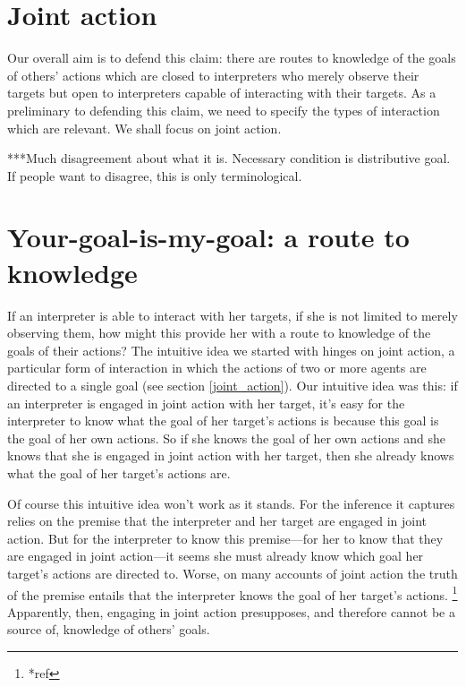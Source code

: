 \documentclass[12pt,a4paper]{extarticle}
\begin{document}
\section{Joint action}
\label{joint_action}
Our overall aim is to defend this claim:
there are routes to knowledge of the goals of others' actions
which are closed to
interpreters who merely observe their targets
but open to 
interpreters capable of interacting with their targets.
As a preliminary to defending this claim,
we need to specify the types of interaction which are relevant.
We shall focus on joint action.

***Much disagreement about what it is.
Necessary condition is distributive goal.
If people want to disagree, this is only terminological.



\section{Your-goal-is-my-goal: a route to knowledge}
If an interpreter is able to interact with her targets,
if she is not limited to merely observing them,
how might this provide her with a route to knowledge of the goals of their actions?
The intuitive idea we started with hinges on joint action, a particular form of interaction in which the actions of two or more agents are directed to a single goal (see section \vref{joint_action}).
Our intuitive idea was this:
if an interpreter is engaged in joint action with her target, 
it's easy for the interpreter to know what the goal of her target's actions is because this goal is the goal of her own actions.
So if she knows the goal of her own actions and she knows that she is engaged in joint action with her target,
then she already knows what the goal of her target's actions are.

Of course this intuitive idea won't work as it stands.  
For the inference it captures relies on the premise that the interpreter and her target are engaged in joint action.
But for the interpreter to know this premise---for her to know that they are engaged in joint action---it seems she must   already know which goal her target's actions are directed to.
Worse,
on many accounts of joint action the truth of the premise  entails that the interpreter knows the goal of her target's actions.%
\footnote{
*ref}
Apparently, then, engaging in joint action presupposes, and therefore cannot be a source of, knowledge of others' goals. 
\end{document}
